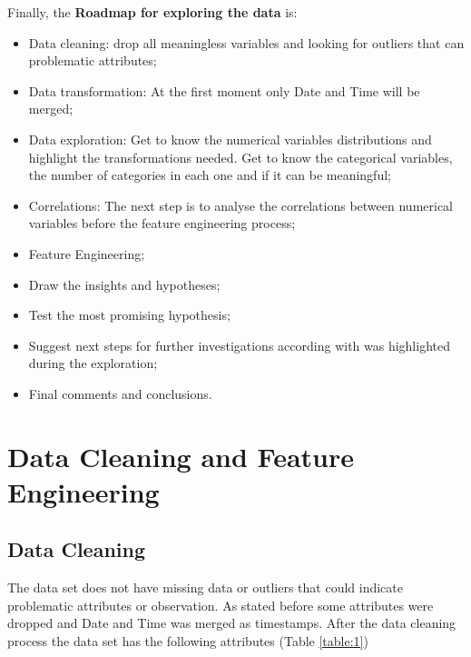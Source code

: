 \documentclass[11pt, a4]{article}
\begin{document}
Finally, the \textbf{Roadmap for exploring the data} is:

\begin{itemize}
\item Data cleaning: drop all meaningless variables and looking for outliers that can problematic attributes;
\item Data transformation: At the first moment only Date and Time will be merged;
\item Data exploration: Get to know the numerical variables distributions and highlight the transformations needed. Get to know the categorical variables, the number of categories in each one and if it can be meaningful;
\item Correlations: The next step is to analyse the correlations between numerical variables before the feature engineering process;
\item Feature Engineering;
\item Draw the insights and hypotheses;
\item Test the most promising hypothesis;
\item Suggest next steps for further investigations according with was highlighted during the exploration;
\item Final comments and conclusions.

\end{itemize}


 

\section*{Data Cleaning and Feature Engineering}

\subsection*{Data Cleaning}

The data set does not have missing data or outliers that could indicate problematic attributes or observation. As stated before some attributes were dropped and Date and Time was merged as timestamps. After the data cleaning process the data set has the following attributes (Table \ref{table:1})
\end{document}
